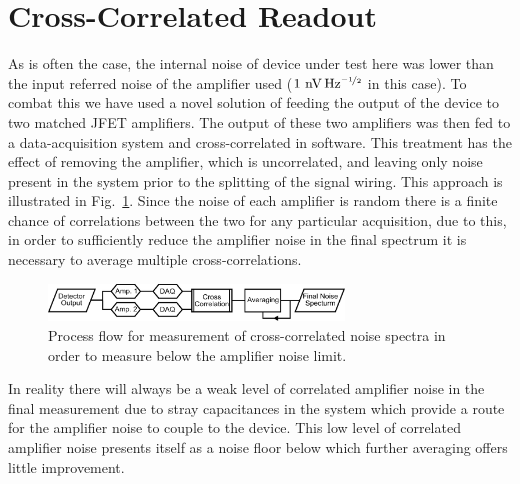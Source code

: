\documentclass[final]{svjour2}
\begin{document}
\section{Cross-Correlated Readout}
As is often the case, the internal noise of device under test here was lower than the input referred noise of the amplifier used ($1~\mathrm{nV\,Hz^{\nicefrac{-1}{2}}}$ in this case). To combat this we have used a novel solution of feeding the output of the device to two matched JFET amplifiers. The output of these two amplifiers was then fed to a data-acquisition system and cross-correlated in software. This treatment has the effect of removing the amplifier, which is uncorrelated, and leaving only noise present in the system prior to the splitting of the signal wiring. This approach is illustrated in Fig.~\ref{fig:crossCol_flow}. Since the noise of each amplifier is random there is a finite chance of correlations between the two for any particular acquisition, due to this, in order to sufficiently reduce the amplifier noise in the final spectrum it is necessary to average multiple cross-correlations.
\begin{figure}[htb]
\centering
\includegraphics[width = 0.7\textwidth]{CrossCol_flow}
\caption{Process flow for measurement of cross-correlated noise spectra in order to measure below the amplifier noise limit.}
\label{fig:crossCol_flow}
\end{figure}
\par 
In reality there will always be a weak level of correlated amplifier noise in the final measurement due to stray capacitances in the system which provide a route for the amplifier noise to couple to the device. This low level of correlated amplifier noise presents itself as a noise floor below which further averaging offers little improvement. %
%
\end{document}
